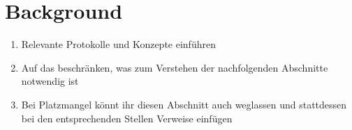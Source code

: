 \section{Background}

\begin{enumerate}
	\item Relevante Protokolle und Konzepte einführen
	\item Auf das beschränken, was zum Verstehen der nachfolgenden Abschnitte notwendig ist
	\item Bei Platzmangel könnt ihr diesen Abschnitt auch weglassen und stattdessen bei den entsprechenden Stellen Verweise einfügen
\end{enumerate}

